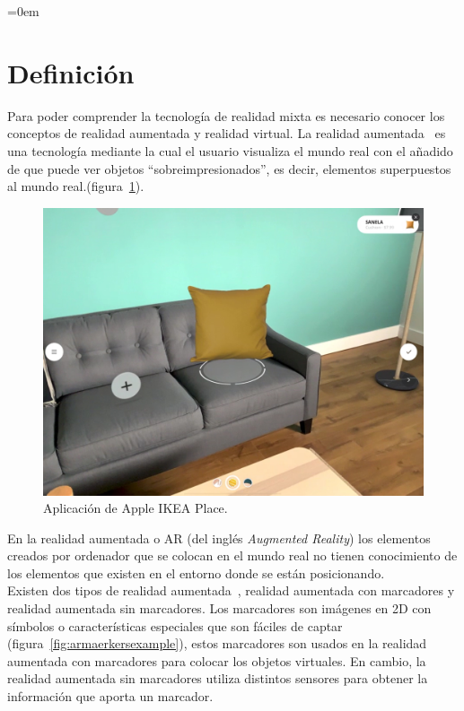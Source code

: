 \parindent=0em
\section{Definición}
\noindent


Para poder comprender la tecnología de realidad mixta es necesario conocer los conceptos de realidad aumentada y realidad virtual. La realidad aumentada~\cite{ardefinition} es una tecnología mediante la cual el usuario visualiza el mundo real con el añadido de que puede ver objetos ``sobreimpresionados'', es decir, elementos superpuestos al mundo real.(figura~\ref{fig:ikeaAR}).

\begin{figure}[H]
    \centering
    \includegraphics[scale=0.25]{Images/Estado del arte/ikeaAR.jpg}
    \caption[Aplicación de Apple IKEA Place]{Aplicación de Apple IKEA Place\footnotemark.}
    \label{fig:ikeaAR}
\end{figure}

En la realidad aumentada o AR (del inglés \textit{Augmented Reality}) los elementos creados por ordenador que se colocan en el mundo real no tienen conocimiento de los elementos que existen en el entorno donde se están posicionando. \\

Existen dos tipos de realidad aumentada~\cite{arwithMarkers}, realidad aumentada con marcadores y realidad aumentada sin marcadores. Los marcadores son imágenes en 2D con símbolos o características especiales que son fáciles de captar (figura~\ref{fig:armaerkersexample}), estos marcadores son usados en la realidad aumentada con marcadores para colocar los objetos virtuales. En cambio, la realidad aumentada sin marcadores utiliza distintos sensores para obtener la información que aporta un marcador.

